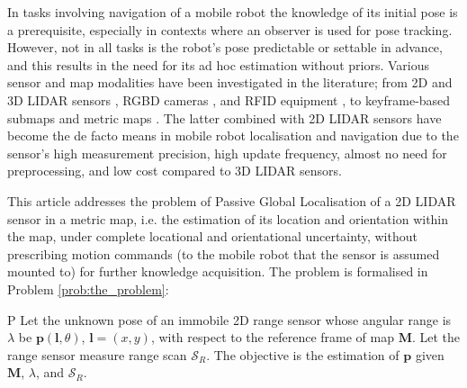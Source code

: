In tasks involving navigation of a mobile robot the knowledge of its initial
pose is a prerequisite, especially in contexts where an observer is used for
pose tracking. However, not in all tasks is the robot's pose predictable or
settable in advance, and this results in the need for its ad hoc estimation
without priors. Various sensor and map modalities have been investigated in the
literature; from 2D and 3D LIDAR sensors \cite{als_eth,Cop2018a}, RGBD
cameras \cite{Guo2016}, and RFID equipment \cite{Tzitzis2023b}, to
keyframe-based submaps \cite{Lowry2016} and metric maps \cite{Rosen2021}. The
latter combined with 2D LIDAR sensors have become the de facto means in mobile
robot localisation and navigation due to the sensor's high measurement
precision, high update frequency, almost no need for preprocessing, and low
cost compared to 3D LIDAR sensors.

This article addresses the problem of Passive Global Localisation of a 2D LIDAR
sensor in a metric map, i.e. the estimation of its location and orientation
within the map, under complete locational and orientational uncertainty,
without prescribing motion commands (to the mobile robot that the sensor is
assumed mounted to) for further knowledge acquisition. The problem is
formalised in Problem \ref{prob:the_problem}:

\begin{customprb}{P}
  \label{prob:the_problem}
  Let the unknown pose of an immobile 2D range sensor whose angular range is
  $\lambda$ be $\bm{p}(\bm{l},\theta)$, $\bm{l} = (x,y)$, with respect to the
  reference frame of map $\bm{M}$. Let the range sensor measure range scan
  $\mathcal{S}_R$. The objective is the estimation of $\bm{p}$ given $\bm{M}$,
  $\lambda$, and $\mathcal{S}_R$.
\end{customprb}

